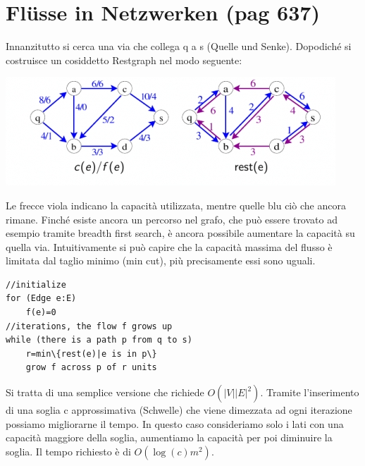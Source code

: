 \documentclass[a4paper]{book}
\begin{document}
\section{Flüsse in Netzwerken (pag 637)}
Innanzitutto si cerca una via che collega q a s (Quelle und Senke). Dopodiché si costruisce un cosiddetto Restgraph nel modo seguente:
\begin{center}
\includegraphics[scale=0.8]{Figures/restgraph.jpg} 
\end{center}
Le frecce viola indicano la capacità utilizzata, mentre quelle blu ciò che ancora rimane. Finché esiste ancora un percorso nel grafo, che può essere trovato ad esempio tramite breadth first search, è ancora possibile aumentare la capacità su quella via. Intuitivamente si può capire che la capacità massima del flusso è limitata dal taglio minimo (min cut), più precisamente essi sono uguali.
\begin{lstlisting}
//initialize
for (Edge e:E)
	f(e)=0
//iterations, the flow f grows up
while (there is a path p from q to s)
	r=min\{rest(e)|e is in p\}
	grow f across p of r units
\end{lstlisting}
Si tratta di una semplice versione che richiede $O(|V||E|^2)$. Tramite l'inserimento di una soglia c approssimativa (Schwelle) che viene dimezzata ad ogni iterazione possiamo migliorarne il tempo. In questo caso consideriamo solo i lati con una capacità maggiore della soglia, aumentiamo la capacità per poi diminuire la soglia. Il tempo richiesto è di $O(\log (c)m^2)$. 
\end{document}
